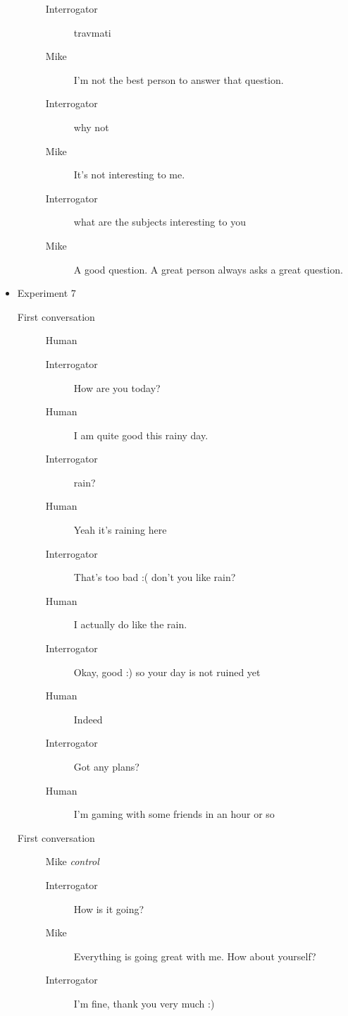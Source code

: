 \begin{itemize}
\begin{description}
\begin{description}
               \item [Interrogator] travmati
               \item [Mike] I'm not the best person to answer that question.
               \item [Interrogator] why not
               \item [Mike] It's not interesting to me.
               \item [Interrogator] what are the subjects interesting to you
               \item [Mike] A good question. A great person always asks a great question.
            \end{description}
      \end{description}

   \item Experiment 7
      \begin{description}
         \item [First conversation] Human
            \begin{description}
               \item [Interrogator] How are you today?
               \item [Human] I am quite good this rainy day.
               \item [Interrogator] rain?
               \item [Human] Yeah it's raining here
               \item [Interrogator] That's too bad :( don't you like rain?
               \item [Human] I actually do like the rain.
               \item [Interrogator] Okay, good :) so your day is not ruined yet
               \item [Human] Indeed
               \item [Interrogator] Got any plans?
               \item [Human] I'm gaming with some friends in an hour or so
            \end{description}
         \item [First conversation] Mike \textit{control}
            \begin{description}
               \item [Interrogator] How is it going?
               \item [Mike] Everything is going great with me. How about yourself?
               \item [Interrogator] I'm fine, thank you very much :)

\end{description}
\end{description}
\end{itemize}
